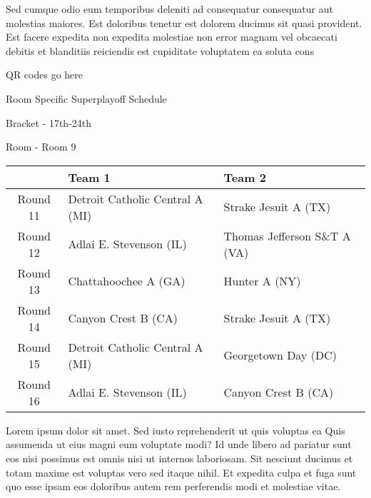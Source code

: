 \documentclass{article}%
\begin{document}
\newline%
    Sed cumque odio eum temporibus deleniti ad consequatur consequatur aut molestias maiores. Est doloribus tenetur est dolorem ducimus sit quasi provident. Est facere expedita non expedita molestiae non error magnam vel obcaecati debitis et blanditiis reiciendis est cupiditate voluptatem ea soluta cons%
\vspace*{140pt}%
\begin{center}%
\begin{Huge}%
QR codes go here%
\end{Huge}%
\end{center}%
\newpage%
\begin{center}%
\begin{Huge}%
Room Specific Superplayoff Schedule%
\end{Huge}%
\vspace*{8pt}%
\linebreak%
\begin{Large}%
Bracket {-} 17th{-}24th%
\end{Large}%
\vspace*{8pt}%
\linebreak%
\vspace*{8pt}%
\begin{Large}%
Room {-} Room 9%
\end{Large}%
\end{center}%
%
\begin{tabularx}{\textwidth}{|c|Y|Y|}%
\hline%
&Team 1&Team 2\\%
\hline%
Round 11&Detroit Catholic Central A (MI)&Strake Jesuit A (TX)\\%
Round 12&Adlai E. Stevenson (IL)&Thomas Jefferson S\&T A (VA)\\%
Round 13&Chattahoochee A (GA)&Hunter A (NY)\\%
Round 14&Canyon Crest B (CA)&Strake Jesuit A (TX)\\%
Round 15&Detroit Catholic Central A (MI)&Georgetown Day (DC)\\%
Round 16&Adlai E. Stevenson (IL)&Canyon Crest B (CA)\\%
\hline%
\end{tabularx}%
\vspace*{8pt}%
\newline%
    Lorem ipsum dolor sit amet. Sed iusto reprehenderit ut quis voluptas ea Quis assumenda ut eius magni eum voluptate modi? Id unde libero ad pariatur sunt eos nisi possimus est omnis nisi ut internos laboriosam. Sit nesciunt ducimus et totam maxime est voluptas vero sed itaque nihil. Et expedita culpa et fuga sunt quo esse ipsam eos doloribus autem rem perferendis modi et molestiae vitae.\newline%
\end{document}

